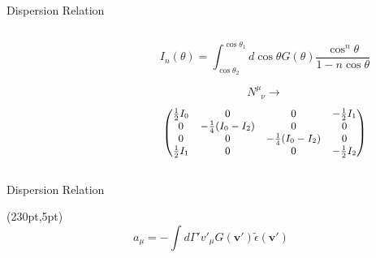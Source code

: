 \documentclass[9pt]{beamer}
\begin{document}
\begin{darkframes}
\begin{frame}{Dispersion Relation}
\begin{columns}[T]
\begin{column}{0.5\textwidth}


\end{column}

\begin{column}{0.5\textwidth}




   \begin{equation*}
      I_n(\theta)=\int_{\cos\theta_2}^{\cos\theta_1} d\cos\theta G(\theta) \frac{\cos^n\theta}{1 - n \cos\theta }
   \end{equation*}




   \begin{equation*}
      N^\mu_{\phantom{\mu}\nu} \to
   \end{equation*}
\begin{equation*}
    \small
  \begin{pmatrix}
   \frac{1}{2}  I_0 & 0 & 0 & -\frac{1}{2}I_1\\
   0 & -\frac{1}{4}(I_0-I_2) & 0 & 0\\
   0 & 0 & -\frac{1}{4}(I_0-I_2) & 0 \\
   \frac{1}{2}I_1 & 0 & 0 & -\frac{1}{2}I_2
   \end{pmatrix}
   \end{equation*}





\end{column}

\end{columns}


\end{frame}


\begin{frame}{Dispersion Relation}

    \begin{textblock*}{100pt}(230pt,5pt)
        \begin{equation*}
            a_\mu = -\int d\Gamma' v'_{\mu} G(\boldsymbol{v}') \tilde \epsilon (\boldsymbol{v}')
        \end{equation*}
    \end{textblock*}



\end{frame}
\end{darkframes}
\end{document}
